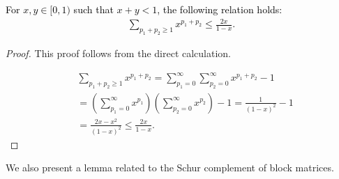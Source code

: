 \documentclass[twoside,11pt]{article}
\newcommand{\revise}[1]{\textcolor{black}{ #1}}
\begin{document}
\revise{\begin{lemma}\label{lem_series}
For $x,y\in[0,1)$ such that $x+y<1$, the following relation holds:
\begin{subequations}
    \begin{align}
        \label{eqn:series1}
\sum_{p_1+p_2\ge 1}x^{p_1+p_2}\le \frac{2x}{1-x}.
    \end{align}
\end{subequations}
\end{lemma}}
\begin{proof}
This proof follows from the direct calculation.

\begin{align*}
&\sum_{p_1+p_2\ge 1}x^{p_1+p_2}=\sum_{p_1=0}^{\infty}\sum_{p_2=0}^{\infty}x^{p_1+p_2}-1\\
&= \left( \sum_{p_1=0}^{\infty}x^{p_1}\right)\left(\sum_{p_2=0}^{\infty}x^{p_2}\right)-1 = \frac{1}{(1-x)^2}-1\\
&=\frac{2x-x^2}{(1-x)^2}\le\frac{2x}{1-x}.
\end{align*}

\end{proof}

We also present a lemma related to the Schur complement of block matrices.
\end{document}
